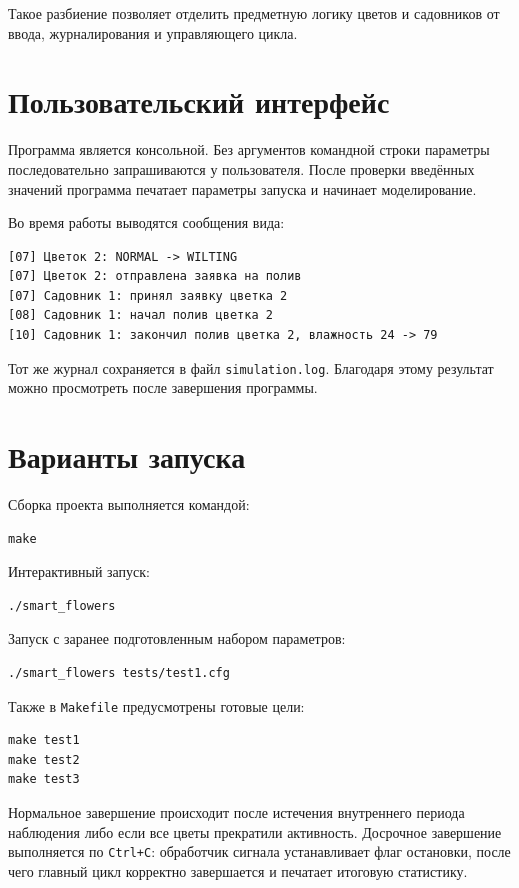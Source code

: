 \documentclass[12pt,a4paper]{article}
\begin{document}
Такое разбиение позволяет отделить предметную логику цветов и садовников от
ввода, журналирования и управляющего цикла.

\section{Пользовательский интерфейс}

Программа является консольной. Без аргументов командной строки параметры
последовательно запрашиваются у пользователя. После проверки введённых значений
программа печатает параметры запуска и начинает моделирование.

Во время работы выводятся сообщения вида:

\begin{verbatim}
[07] Цветок 2: NORMAL -> WILTING
[07] Цветок 2: отправлена заявка на полив
[07] Садовник 1: принял заявку цветка 2
[08] Садовник 1: начал полив цветка 2
[10] Садовник 1: закончил полив цветка 2, влажность 24 -> 79
\end{verbatim}

Тот же журнал сохраняется в файл \texttt{simulation.log}. Благодаря этому
результат можно просмотреть после завершения программы.

\section{Варианты запуска}

Сборка проекта выполняется командой:

\begin{lstlisting}
make
\end{lstlisting}

Интерактивный запуск:

\begin{lstlisting}
./smart_flowers
\end{lstlisting}

Запуск с заранее подготовленным набором параметров:

\begin{lstlisting}
./smart_flowers tests/test1.cfg
\end{lstlisting}

Также в \texttt{Makefile} предусмотрены готовые цели:

\begin{lstlisting}
make test1
make test2
make test3
\end{lstlisting}

Нормальное завершение происходит после истечения внутреннего периода наблюдения либо
если все цветы прекратили активность. Досрочное завершение выполняется по
\texttt{Ctrl+C}: обработчик сигнала устанавливает флаг остановки, после чего
главный цикл корректно завершается и печатает итоговую статистику.
\end{document}
